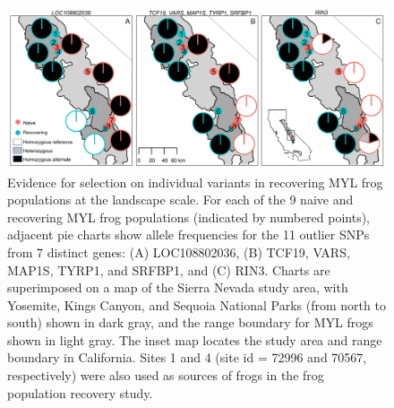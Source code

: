 \documentclass[
  letterpaper,
  DIV=11,
  numbers=noendperiod]{scrartcl}
\begin{document}
\begin{figure}

{\centering \includegraphics[width=6.25in,height=\textheight]{figures/allele_maps.png}

}

\caption{\label{fig-allelefrequencies}Evidence for selection on
individual variants in recovering MYL frog populations at the landscape
scale. For each of the 9 naive and recovering MYL frog populations
(indicated by numbered points), adjacent pie charts show allele
frequencies for the 11 outlier SNPs from 7 distinct genes: (A)
LOC108802036, (B) TCF19, VARS, MAP1S, TYRP1, and SRFBP1, and (C) RIN3.
Charts are superimposed on a map of the Sierra Nevada study area, with
Yosemite, Kings Canyon, and Sequoia National Parks (from north to south)
shown in dark gray, and the range boundary for MYL frogs shown in light
gray. The inset map locates the study area and range boundary in
California. Sites 1 and 4 (site id = 72996 and 70567, respectively) were
also used as sources of frogs in the frog population recovery study.}

\end{figure}

\newpage
\end{document}
